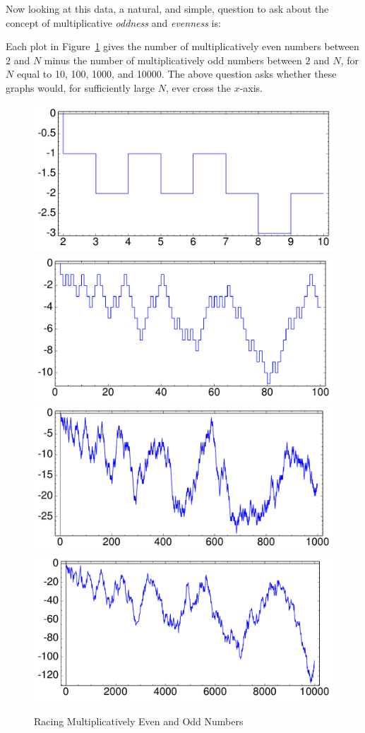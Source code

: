 \documentclass[11pt,draft]{article}
\theoremstyle{plain}
\theoremstyle{definition}
\numberwithin{equation}{section}
\numberwithin{figure}{section}
\numberwithin{table}{section}
\begin{document}
  
   Now looking at this data, a natural, and simple, question to ask about the concept of multiplicative {\em oddness} and {\em evenness} is: 
   

Each plot in Figure~\ref{fig:liouville} gives the number of
multiplicatively even numbers between $2$ and $N$ minus the number of
multiplicatively odd numbers between $2$ and $N$, for $N$ equal to 10,
100, 1000, and 10000. The above question asks whether these graphs
would, for sufficiently large $N$, ever cross the $x$-axis.

 \begin{figure}[H]
\begin{center}
\includegraphics[width=.4\textwidth]{illustrations/liouville-10}
\includegraphics[width=.4\textwidth]{illustrations/liouville-100}\\
\includegraphics[width=.4\textwidth]{illustrations/liouville-1000}
\includegraphics[width=.4\textwidth]{illustrations/liouville-10000}\\
\caption{Racing Multiplicatively Even and Odd Numbers\label{fig:liouville}}
\end{center}
\end{figure}
  
\end{document}
